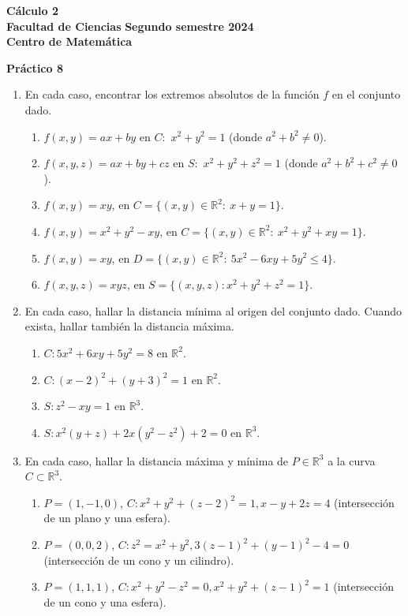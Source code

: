\documentclass[11pt]{article}
\newcommand{\be}{\begin{enumerate}}
\newcommand{\ee}{\end{enumerate}}
\newcommand{\R}{\mathbb{R}}
\begin{document}
 \hfill {\bf C\'{a}lculo 2} \\
{\bf Facultad de Ciencias} \hfill {\bf Segundo semestre 2024} \\
{\bf Centro de Matem\'{a}tica} 

\vspace{1cm}

\begin{center}
{\bf Pr\'{a}ctico 8 }
\end{center}

\vspace{0,1cm}

\begin{enumerate}

\item En cada caso, encontrar los extremos absolutos de la funci\'on $f$ en el conjunto dado.
 \be
   \item $f(x,y)=ax+by$ en $C:$ $x^2+y^2=1$ (donde $a^2+b^2 \neq 0$). 
   \item $f(x,y,z) = ax+by+cz$ en $S:$ $x^2+y^2+z^2 =1$ (donde $a^2+b^2+c^2
     \neq 0$). 
   \item $f(x,y)=xy$, en $C=\{(x,y)\in \R^2:\ x+y=1\}$.

\item $f(x,y)=x^2+y^2-xy$, en $C=\{(x,y)\in \R^2:\ x^2+y^2+xy=1\}$.

\item $f(x,y)=xy$, en $D=\{(x,y)\in \R^2:\ 5x^2-6xy+5y^2\leq 4\}$.
\item $f (x, y, z) = xyz$, en $S = \{(x, y, z) : x^2 + y^2 + z^2 = 1\}$. 
  \ee

\item En cada caso, hallar la distancia m\'inima al origen del conjunto dado. Cuando exista, hallar tambi\'en la distancia m\'axima. 
\be
\item $C:5x^2+6xy+5y^2 = 8$ en $\R^2$.
\item  $C:(x-2)^2+(y+3)^2=1$ en $\R^2$.
\item $S:z^2-xy=1$ en $\R^3$.
\item $S:x^2(y+z)+2x(y^2-z^2)+2=0$ en $\R^3$.
\ee

\item En cada caso, hallar la distancia m\'axima y m\'inima de $P\in\R^3$ a la curva $C\subset\R^3$.
\be
\item $P=(1,-1,0)$, $C: x^2+y^2+(z-2)^2=1, x-y+2z=4$ (intersecci\'on de un plano y una esfera).   
\item $P=(0,0,2)$, $C: z^2=x^2+y^2, 3(z-1)^2+(y-1)^2-4=0$ (intersecci\'on de un cono y un cilindro).
\item $P=(1,1,1)$, $C:x^2+y^2-z^2=0, x^2+y^2+(z-1)^2=1$ (intersecci\'on de un cono y una esfera). 
\ee


\end{enumerate}
\end{document}
